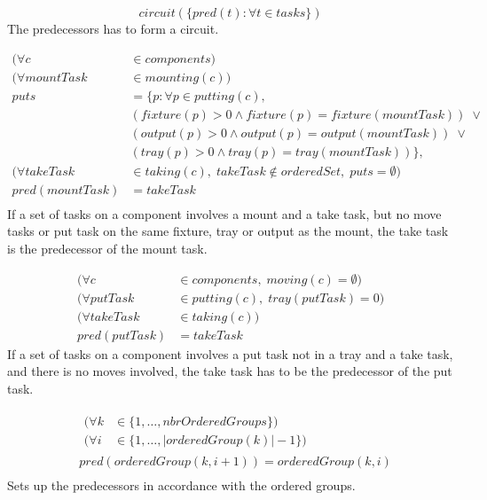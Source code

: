 \documentclass[10pt,a4paper]{report}
\begin{document}
\begin{equation}\label{eq:111}
circuit(\{pred(t) : \forall t \in tasks\})\end{equation}
The predecessors has to form a circuit.

\begin{equation}
\begin{aligned}\label{eq:112}
(\forall c &\in components) \\
(\forall mountTask &\in mounting(c)) \\
puts &= \{p : \forall p \in putting(c),\\
&(fixture(p) > 0 \land fixture(p) = fixture(mountTask)) \; \lor  \\
&(output(p) > 0 \land output(p) = output(mountTask)) \; \lor  \\
&(tray(p) > 0 \land tray(p) = tray(mountTask))\}, \\
(\forall takeTask &\in taking(c), \; takeTask \notin orderedSet, \; puts = \emptyset) \\
pred(mountTask) &= takeTask \\
\end{aligned}
\end{equation}
If a set of tasks on a component involves a mount and a take task, but no move tasks or put task on the same fixture, tray or output as the mount, the take task is the predecessor of the mount task.

\begin{equation}
\begin{aligned}\label{eq:113}
(\forall c &\in components, \; moving(c) = \emptyset)\\
(\forall putTask &\in putting(c), \; tray(putTask) = 0)\\
(\forall takeTask &\in taking(c))\\
pred(putTask) &= takeTask
\end{aligned}
\end{equation}
If a set of tasks on a component involves a put task not in a tray and a take task, and there is no moves involved, the take task has to be the predecessor of the put task.

\begin{equation}
\begin{aligned}\label{eq:114}
&\begin{aligned}
(\forall k &\in \{1 , \ldots , nbrOrderedGroups\}) \\
(\forall i &\in \{1 , \ldots , |orderedGroup(k)|-1\}) 
\end{aligned}\\
&pred(orderedGroup(k, i + 1)) = orderedGroup(k, i) \\
\end{aligned}
\end{equation}
Sets up the predecessors in accordance with the ordered groups.
\end{document}
